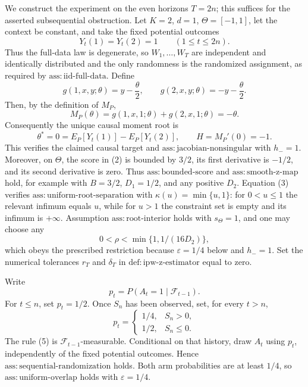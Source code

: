 We construct the experiment on the even horizons \(T=2n\); this suffices for the asserted subsequential obstruction. Let \(K=2\), \(d=1\), \(\Theta=[-1,1]\), let the context be constant, and take the fixed potential outcomes
\[
 Y_t(1)=Y_t(2)=1\qquad(1\le t\le 2n).
\tag{1}
\]
Thus the full-data law is degenerate, so \(W_1,\ldots,W_T\) are independent and identically distributed and the only randomness is the randomized assignment, as required by \(\mathrm{ass:iid\text{-}full\text{-}data}\). Define
\[
 g(1,x,y;\theta)=y-\frac{\theta}{2},
 \qquad
 g(2,x,y;\theta)=-y-\frac{\theta}{2}.
\tag{2}
\]
Then, by the definition of \(M_P\),
\[
 M_P(\theta)=g(1,x,1;\theta)+g(2,x,1;\theta)=-\theta.
\tag{3}
\]
Consequently the unique causal moment root is
\[
 \theta^*=0=E_P[Y_t(1)]-E_P[Y_t(2)],
 \qquad H=M_P'(0)=-1.
\tag{4}
\]
This verifies the claimed causal target and \(\mathrm{ass:jacobian\text{-}nonsingular}\) with \(h_-=1\). Moreover, on \(\Theta\), the score in (2) is bounded by \(3/2\), its first derivative is \(-1/2\), and its second derivative is zero. Thus \(\mathrm{ass:bounded\text{-}score}\) and \(\mathrm{ass:smooth\text{-}z\text{-}map}\) hold, for example with \(B=3/2\), \(D_1=1/2\), and any positive \(D_2\). Equation (3) verifies \(\mathrm{ass:uniform\text{-}root\text{-}separation}\) with \(\kappa(u)=\min\{u,1\}\): for \(0<u\le1\) the relevant infimum equals \(u\), while for \(u>1\) the constraint set is empty and its infimum is \(+\infty\). Assumption \(\mathrm{ass:root\text{-}interior}\) holds with \(s_\Theta=1\), and one may choose any
\[
 0<\rho<\min\{1,1/(16D_2)\},
\]
which obeys the prescribed restriction because \(\varepsilon=1/4\) below and \(h_-=1\). Set the numerical tolerances \(r_T\) and \(\delta_T\) in \(\mathrm{def:ipw\text{-}z\text{-}estimator}\) equal to zero.

Write
\[
 p_t=P(A_t=1\mid\mathcal F_{t-1}).
\]
For \(t\le n\), set \(p_t=1/2\). Once \(S_n\) has been observed, set, for every \(t>n\),
\[
 p_t=
 \begin{cases}
 1/4,&S_n>0,\\
 1/2,&S_n\le0.
 \end{cases}
\tag{5}
\]
The rule (5) is \(\mathcal F_{t-1}\)-measurable. Conditional on that history, draw \(A_t\) using \(p_t\), independently of the fixed potential outcomes. Hence \(\mathrm{ass:sequential\text{-}randomization}\) holds. Both arm probabilities are at least \(1/4\), so \(\mathrm{ass:uniform\text{-}overlap}\) holds with \(\varepsilon=1/4\).

